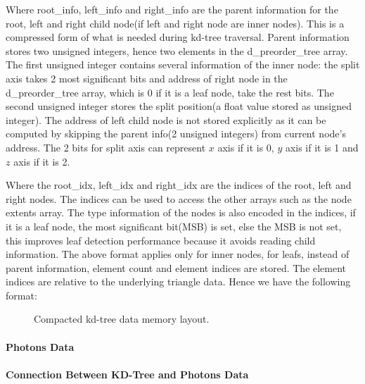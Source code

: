Where root\_info, left\_info and right\_info are the parent information for the root, left and right child node(if left and right node are inner nodes). This is a compressed form of what is needed during kd-tree traversal. Parent information stores two unsigned integers, hence two elements in the d\_preorder\_tree array. The first unsigned integer contains several information of the inner node: the split axis takes 2 most significant bits and address of right node in the d\_preorder\_tree array, which is 0 if it is a leaf node, take the rest bits. The second unsigned integer stores the split position(a float value stored as unsigned integer). The address of left child node is not stored explicitly as it can be computed by skipping the parent info(2 unsigned integers) from current node's address. The 2 bits for split axis can represent \(x\) axis if it is 0, \(y\) axis if it is 1 and \(z\) axis if it is 2. 

Where the root\_idx, left\_idx and right\_idx are the indices of the root, left and right nodes. The indices can be used to access the other arrays such as the node extents array. The type information of the nodes is also encoded in the indices, if it is a leaf node, the most significant bit(MSB) is set, else the MSB is not set, this improves leaf detection performance because it avoids reading child information. The above format applies only for inner nodes, for leafs, instead of parent information, element count and element indices are stored. The element indices are relative to the underlying triangle data. Hence we have the following format: 

\begin{figure}[htp] 
    \centering 
    \renewcommand{\thefigure}{\thechapter.\arabic{figure}}
    \caption[]{Compacted kd-tree data memory layout.}
    \label{fig:kdtree_data_memory_layout} 
\end{figure}  

\paragraph{Photons Data} 


\paragraph{Connection Between KD-Tree and Photons Data} 

